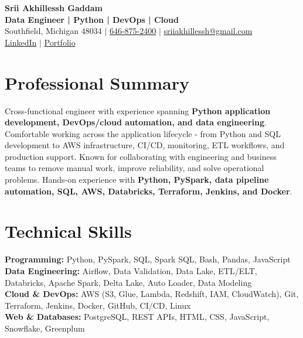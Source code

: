 \documentclass[letterpaper,10pt]{article}
\begin{document}
\fontsize{9.35pt}{10.45pt}\selectfont

\begin{center}
    {\LARGE \textbf{Srii Akhillessh Gaddam}} \\[-1pt]
    \textbf{Data Engineer | Python | DevOps | Cloud} \\[2pt]
    Southfield, Michigan 48034 $|$
    \href{tel:6468752400}{646-875-2400} $|$
    \href{mailto:sriiakhillessh@gmail.com}{sriiakhillessh@gmail.com} \\[1pt]
    \href{https://www.linkedin.com/in/srii-akhiilessh-gaddam-b48668191/}{LinkedIn} $|$
    \href{https://sriiakhillesshg.github.io/portfolio/}{Portfolio}
\end{center}
\vspace{-8pt}

\section{Professional Summary}
\small{Cross-functional engineer with experience spanning \textbf{Python application development, DevOps/cloud automation, and data engineering}. Comfortable working across the application lifecycle - from Python and SQL development to AWS infrastructure, CI/CD, monitoring, ETL workflows, and production support. Known for collaborating with engineering and business teams to remove manual work, improve reliability, and solve operational problems. Hands-on experience with \textbf{Python, PySpark, data pipeline automation, SQL, AWS, Databricks, Terraform, Jenkins, and Docker}.}

\section{Technical Skills}
\small{
\textbf{Programming:} Python, PySpark, SQL, Spark SQL, Bash, Pandas, JavaScript \\
\textbf{Data Engineering:} Airflow, Data Validation, Data Lake, ETL/ELT, Databricks, Apache Spark, Delta Lake, Auto Loader, Data Modeling \\
\textbf{Cloud \& DevOps:} AWS (S3, Glue, Lambda, Redshift, IAM, CloudWatch), Git, Terraform, Jenkins, Docker, GitHub, CI/CD, Linux \\
\textbf{Web \& Databases:} PostgreSQL, REST APIs, HTML, CSS, JavaScript, Snowflake, Greenplum
}
\end{document}
